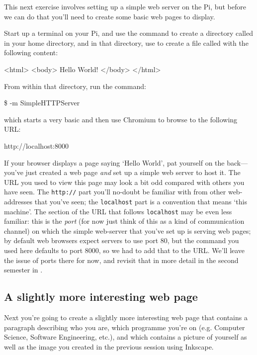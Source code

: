 This next exercise involves setting up a simple web server on the Pi, but before we can do that you'll need to create some basic web pages to display.

Start up a terminal on your Pi, and use the  command to create a directory called  in your home directory, and in that directory, use  to create a file called  with the following content:

\begin{ttoutenv}
<html>
  <body>
    Hello World!
  </body>
</html>
\end{ttoutenv}

From within that directory, run the command:

\begin{ttoutenv}
\$  -m SimpleHTTPServer
\end{ttoutenv}

which starts a very basic  and then use Chromium to browse to the following URL:

\begin{ttoutenv}
http://localhost:8000
\end{ttoutenv}

If your browser displays a page saying `Hello World', pat yourself on
the back---you've just created a web page \textit{and} set up a simple
web server to host it. The URL you used to view this page may look a
bit odd compared with others you have seen. The \texttt{http://} part
you'll no-doubt be familiar with from other web-addresses that you've
seen; the \texttt{localhost} part is a convention that means `this
machine'. The section of the URL that follows \texttt{localhost} may
be even less familiar: this is the \textit{port} (for now just think
of this as a kind of communication channel) on which the simple
web-server that you've set up is serving web pages; by default web
browsers expect servers to use port 80, but the  command you used here defaults to port 8000, so we
had to add that to the URL. We'll leave the issue of ports there for
now, and revisit that in more detail in the second semester in
.

\subsection{A slightly more interesting web page}

Next you're going to create a slightly more interesting web page that
contains a paragraph describing who you are, which programme you're on
(e.g. Computer Science, Software Engineering, etc.), and which
contains a picture of yourself as well as the image you created in the
previous session using Inkscape.

